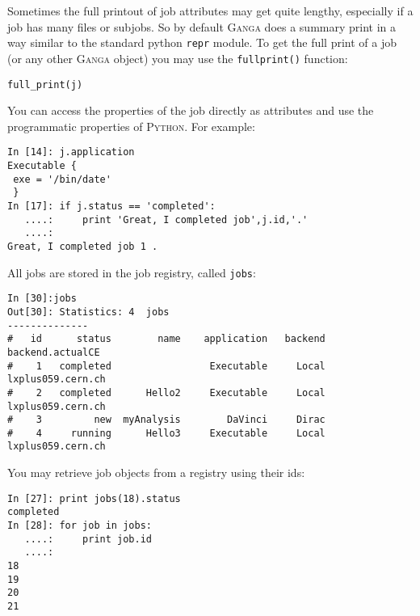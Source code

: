 \documentclass{howto}
\def\ganga {\textsc{Ganga}\xspace}
\def\python {\textsc{Python}\xspace}
\begin{document}
\begin{notice}
Sometimes the full printout of job attributes may get quite lengthy, especially
if a job has many files or subjobs. So by default \ganga does a summary print in
a way similar to the standard python \texttt{repr} module. To get the
full print of a job (or any other \ganga object) you may use the \texttt{fullprint()} function:
\begin{verbatim}
full_print(j)
\end{verbatim}
\end{notice}

You can access the properties of the job directly as attributes and use the
programmatic properties of \python. For example:
\begin{verbatim}
In [14]: j.application
Executable {
 exe = '/bin/date'
 }
In [17]: if j.status == 'completed':
   ....:     print 'Great, I completed job',j.id,'.'
   ....:
Great, I completed job 1 .
\end{verbatim}

All jobs are stored in the job registry, called \texttt{jobs}:
\begin{verbatim}
In [30]:jobs
Out[30]: Statistics: 4  jobs
--------------
#   id      status        name    application   backend   backend.actualCE  
#    1   completed                 Executable     Local  lxplus059.cern.ch  
#    2   completed      Hello2     Executable     Local  lxplus059.cern.ch  
#    3         new  myAnalysis        DaVinci     Dirac                     
#    4     running      Hello3     Executable     Local  lxplus059.cern.ch  
\end{verbatim}

You may retrieve job objects from a registry using their ids:
\begin{verbatim}
In [27]: print jobs(18).status
completed
In [28]: for job in jobs:
   ....:     print job.id
   ....:
18
19
20
21
\end{verbatim}
\end{document}
